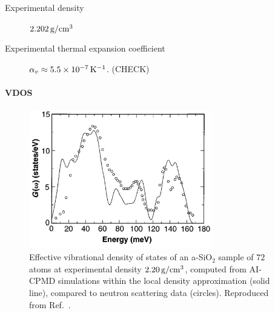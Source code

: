 \begin{description}
    \item[Experimental density] $2.202\,\mathrm{g/cm^3}$
    \item[Experimental thermal expansion coefficient] $\alpha_v \approx 5.5\times 10^{-7}\,\mathrm{K^{-1}}$. (CHECK)
\end{description}

\paragraph{VDOS}
\begin{figure}
    \centering
    \includegraphics[width=8cm]{chapters/chapter6/figures/Sarnthein_Car_abinitio_VDOS_silica-2.jpg}
    \caption{
    Effective vibrational density of states of an a-SiO$_2$ sample of $72$ atoms at experimental density $2.20\,\mathrm{g/cm^3}$, computed from AI-CPMD simulations within the local density approximation (solid line), compared to neutron scattering data (circles). Reproduced from Ref.~\cite{Sarnthein1997}.}
    \label{fig:silica-vdos-abinitio}
\end{figure}
